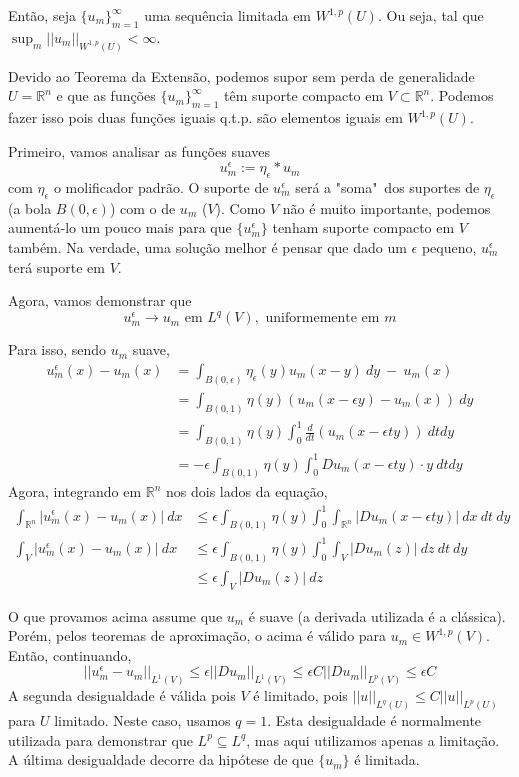 \documentclass[11pt]{article}
\newcommand{\Rn}{{\mathbb{R}^n}}
\newcommand{\rn}{{\mathbb{R}^n}}
\newcommand{\e}{\epsilon}
\begin{document}
Então, seja $\{u_m\}_{m=1}^\infty$ uma sequência limitada em $W^{1,p}(U)$. Ou seja, tal que $\sup_m ||u_m||_{W^{1,p}(U)} < \infty$.

Devido ao Teorema da Extensão, podemos supor sem perda de generalidade $U=\Rn$ e que as funções $\{u_m\}_{m=1}^\infty$ têm suporte compacto em $V \subset \Rn$. Podemos fazer isso pois duas funções iguais q.t.p. são elementos iguais em $W^{1,p}(U)$.

Primeiro, vamos analisar as funções suaves \[ u_m^\e := \eta_\e * u_m \] com $ \eta_\e $ o molificador padrão.  O suporte de $u_m^\e$ será a "soma"\ dos suportes de $\eta_\e$ (a bola $B(0,\e)$) com o de $u_m$ ($V$). Como $V$ não é muito importante, podemos aumentá-lo um pouco mais para que $\{u_m^\e\}$ tenham suporte compacto em $V$ também. Na verdade, uma solução melhor é pensar que dado um $\e$ pequeno, $u_m^\e$ terá suporte em $V$.

Agora, vamos demonstrar que \[ u_m^\e \rightarrow u_m \text{ em } L^q(V), \text{ uniformemente em } m\]

Para isso, sendo $u_m$ suave, \begin{align*}
	u_m^\e(x) - u_m(x) &= \int_{B(0,\e)} \eta_\e(y)u_m(x-y)\ dy\  -\  u_m(x)\\
	&= \int_{B(0,1)} \eta(y)\left(u_m(x-\e y) - u_m(x)\right)\ dy\\
	&=  \int_{B(0,1)} \eta(y) \int_0^1 \frac{d}{dt} (u_m(x-\e t y))\ dtdy \\
	&=  -\e \int_{B(0,1)} \eta(y) \int_0^1 Du_m(x - \e t y)\cdot y\ dtdy
\end{align*}
Agora, integrando em $\rn$ nos dois lados da equação, \begin{align*}
	\int_\Rn |	u_m^\e(x) - u_m(x) |\ dx &\leq \e  \int_{B(0,1)} \eta(y) \int_0^1 \int_\Rn  |Du_m(x - \e t y)|\ dx\ dt\ dy\\
	\int_V |	u_m^\e(x) - u_m(x) |\ dx &\leq \e  \int_{B(0,1)} \eta(y) \int_0^1 \int_V  |Du_m(z)|\ dz\ dt\ dy\\
	&\leq \e \int_V |Du_m(z)| \ dz
\end{align*}

O que provamos acima assume que $u_m$ é suave (a derivada utilizada
 é a clássica). Porém, pelos teoremas de aproximação, o acima é válido para $u_m \in W^{1,p}(V)$. Então, continuando,\[ 
	||u_m^\e - u_m||_{L^1(V)} \leq \e ||Du_m||_{L^1(V)} \leq \e C ||Du_m||_{L^p(V)} \leq \e C \]
A segunda desigualdade é válida pois $V$ é limitado, pois $||u||_{L^q(U)} \leq C ||u||_{L^p(U)}$ para $U$ limitado. Neste caso, usamos $q=1$. Esta desigualdade é normalmente utilizada para demonstrar que $L^p \subseteq L^q$, mas aqui utilizamos apenas a limitação. A última desigualdade decorre da hipótese de que $\{u_m\}$ é limitada.
\end{document}
